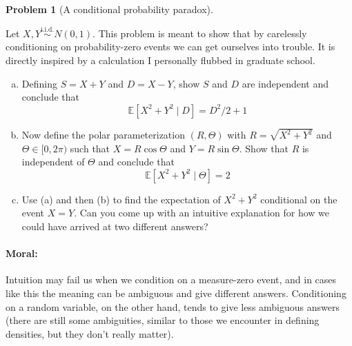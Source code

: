 \documentclass{article}
\newcommand{\EE}{\mathbb{E}}
\newcommand{\simiid}{\overset{\text{i.i.d.}}{\sim}}
\theoremstyle{definition}
\newtheorem{problem}{Problem}
\begin{document}
\begin{problem}[A conditional probability paradox]
\label{prob:conditional-paradox}

Let $X,Y \simiid N(0,1)$. This problem is meant to show that by carelessly conditioning on probability-zero events we can get ourselves into trouble. It is directly inspired by a calculation I personally flubbed in graduate school.

\begin{enumerate}[(a)]
\item Defining $S = X + Y$ and $D = X - Y$, show $S$ and $D$ are independent and conclude that
\[
\EE[X^2 + Y^2 \mid D] = D^2/2 + 1
\]

\item Now define the polar parameterization $(R,\Theta)$ with $R = \sqrt{X^2 + Y^2}$ and $\Theta \in [0,2\pi)$ such that $X  = R\cos \Theta$ and $Y = R\sin \Theta$. Show that $R$ is independent of $\Theta$ and conclude that
\[
\EE[X^2 + Y^2 \mid \Theta] = 2
\]

\item Use (a) and then (b) to find the expectation of $X^2 + Y^2$ conditional on the event $X = Y$. Can you come up with an intuitive explanation for how we could have arrived at two different answers?

\end{enumerate}

\paragraph{Moral:} Intuition may fail us when we condition on a measure-zero event, and in cases like this the meaning can be ambiguous and give different answers. Conditioning on a random variable, on the other hand, tends to give less ambiguous answers (there are still some ambiguities, similar to those we encounter in defining densities, but they don't really matter).
\end{problem}
\end{document}
